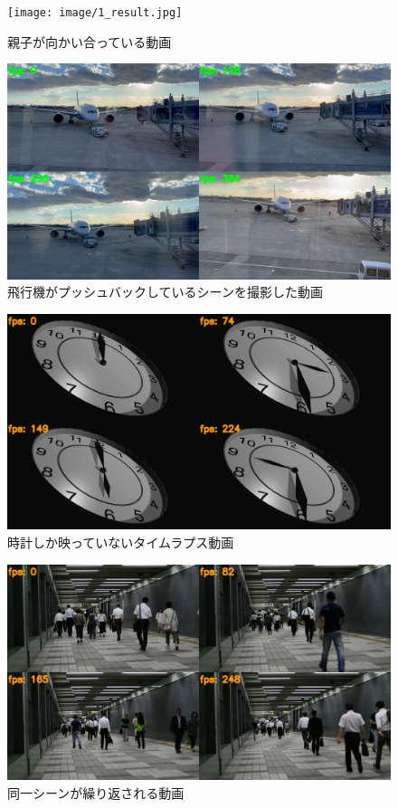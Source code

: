 \documentclass[a4j,12pt,dvipdfmx]{jreport}
\begin{document}
\begin{figure}[H]
  \centering
  \texttt{[image: image/1\_result.jpg]}
  \caption{親子が向かい合っている動画}
  \label{fig:movie1}
\end{figure}

\begin{figure}[H]
  \centering
  \includegraphics[width=13cm]{image/2_result.jpg}
  \caption{飛行機がプッシュバックしているシーンを撮影した動画}
  \label{fig:movie2}
\end{figure}

\begin{figure}[H]
  \centering
  \includegraphics[width=13cm]{image/3_result.jpg}
  \caption{時計しか映っていないタイムラプス動画}
  \label{fig:movie3}
\end{figure}

\begin{figure}[H]
  \centering
  \includegraphics[width=13cm]{image/4_result.jpg}
  \caption{同一シーンが繰り返される動画}
  \label{fig:movie4}
\end{figure}
\end{document}
